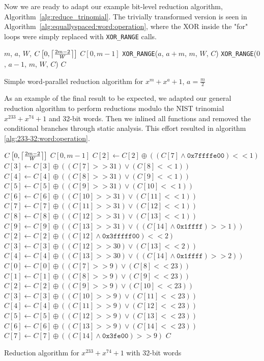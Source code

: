 Now we are ready to adapt our example bit-level reduction algorithm, Algorithm~\ref{alg:reduce_trinomial}. The trivially transformed version is seen in Algorithm~\ref{alg:equallyspaced:word:operation}, where the XOR inside the "for" loops were simply replaced with \texttt{XOR\_RANGE} calls. \\

\begin{algorithm}
\begin{algorithmic}[1]
  \REQUIRE $m$, $a$, $W$, $C\left[0,\ceil*{\frac{2m-2}{W}}\right]$
  \ENSURE $C[0,m-1]$
  \STATE \texttt{XOR\_RANGE}($a$, $a+m$, $m$, $W$, $C$)
  \STATE \texttt{XOR\_RANGE}($0$, $a-1$, $m$, $W$, $C$)
  \RETURN $C$
  \caption{Simple word-parallel reduction algorithm for $x^m + x^a +1$, $a = \frac{m}{2}$}
  \label{alg:equallyspaced:word:operation}
\end{algorithmic}
\end{algorithm}

As an example of the final result to be expected, we adapted our general reduction algorithm to perform reductions modulo the NIST trinomial $x^{233} + x^{74} + 1$ and 32-bit words. Then we inlined all functions and removed the conditional branches through static analysis. This effort resulted in algorithm \ref{alg:233-32:word:operation}.

\begin{algorithm}
\begin{algorithmic}[1]
  \REQUIRE $C\left[0,\ceil*{\frac{2m-2}{W}}\right]$
  \ENSURE $C[0,m-1]$
  \STATE $C[2] \gets C[2] \oplus ((C[7] \land \texttt{0x7ffffe00}) << 1)$
  \STATE $C[3] \gets C[3] \oplus ((C[7] >> 31) \lor (C[8] << 1))$
  \STATE $C[4] \gets C[4] \oplus ((C[8] >> 31) \lor (C[9] << 1))$
  \STATE $C[5] \gets C[5] \oplus ((C[9] >> 31) \lor (C[10] << 1))$
  \STATE $C[6] \gets C[6] \oplus ((C[10] >> 31) \lor (C[11] << 1))$
  \STATE $C[7] \gets C[7] \oplus ((C[11] >> 31) \lor (C[12] << 1))$
  \STATE $C[8] \gets C[8] \oplus ((C[12] >> 31) \lor (C[13] << 1))$
  \STATE $C[9] \gets C[9] \oplus ((C[13] >> 31) \lor ((C[14] \land \texttt{0x1ffff}) >> 1))$
  \STATE $C[2] \gets C[2] \oplus ((C[12] \land \texttt{0x3fffff00}) << 2)$
  \STATE $C[3] \gets C[3] \oplus ((C[12] >> 30) \lor (C[13] << 2))$
  \STATE $C[4] \gets C[4] \oplus ((C[13] >> 30) \lor ((C[14] \land \texttt{0x1ffff}) >> 2))$
  \STATE $C[0] \gets C[0] \oplus ((C[7] >> 9) \lor (C[8] << 23))$
  \STATE $C[1] \gets C[1] \oplus ((C[8] >> 9) \lor (C[9] << 23))$
  \STATE $C[2] \gets C[2] \oplus ((C[9] >> 9) \lor (C[10] << 23))$
  \STATE $C[3] \gets C[3] \oplus ((C[10] >> 9) \lor (C[11] << 23))$
  \STATE $C[4] \gets C[4] \oplus ((C[11] >> 9) \lor (C[12] << 23))$
  \STATE $C[5] \gets C[5] \oplus ((C[12] >> 9) \lor (C[13] << 23))$
  \STATE $C[6] \gets C[6] \oplus ((C[13] >> 9) \lor (C[14] << 23))$
  \STATE $C[7] \gets C[7] \oplus ((C[14] \land \texttt{0x3fe00}) >> 9)$
  \RETURN $C$
  \caption{Reduction algorithm for $x^{233} + x^{74} + 1$ with 32-bit words}
  \label{alg:233-32:word:operation}
\end{algorithmic}
\end{algorithm}

